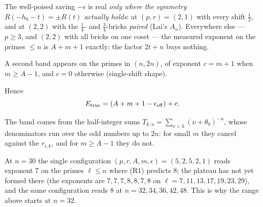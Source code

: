 \begin{finding}\label{find:R1R2}
\begin{description}[leftmargin=2.6em,itemsep=3pt]
\item[\textup{(R1)}] The well-poised saving $-\epsilon$ is real \emph{only where the symmetry
  $R(-h_0-t)=\pm R(t)$ actually holds}: at $(p,r)=(2,1)$ with every shift $\tfrac12$, and at
  $(2,2)$ with the $\tfrac14$- and $\tfrac34$-bricks \emph{paired} (Lai's $A_n$). Everywhere
  else --- $p\ge3$, and $(2,2)$ with all bricks on one coset --- the measured exponent on the
  primes $\le n$ is $A+m+1$ exactly: the factor $2t+n$ buys nothing.
\item[\textup{(R2)}] A second band appears on the primes in $(n,2n)$, of exponent
  $c=m+1$ when $m\ge A-1$, and $c=0$ otherwise (single-shift shape).
\end{description}
Hence
\begin{equation}\label{eq:Etrue}
 E_{\mathrm{true}}=(A+m+1-\epsilon_{\mathrm{eff}})+c .
\end{equation}
\end{finding}

The band comes from the half-integer sums $T_{k,u}=\sum_{\nu<k}(\nu+\theta_0)^{-u}$, whose
denominators run over the odd numbers up to $2n$: for small $m$ they cancel against the
$r_{i,k}$, and for $m\ge A-1$ they do not.

\begin{remark}\label{rem:R1R2exc}
At $n=30$ the single configuration $(p,r,A,m,\epsilon)=(5,2,5,2,1)$ reads exponent $7$ on
the primes $\ell\le n$ where (R1) predicts $8$; the plateau has not yet formed there (the
exponents are $7,7,7,8,8,7,8$ on $\ell=7,11,13,17,19,23,29$), and the same configuration
reads $8$ at $n=32,34,36,42,48$. This is why the range above starts at $n=32$.
\end{remark}


